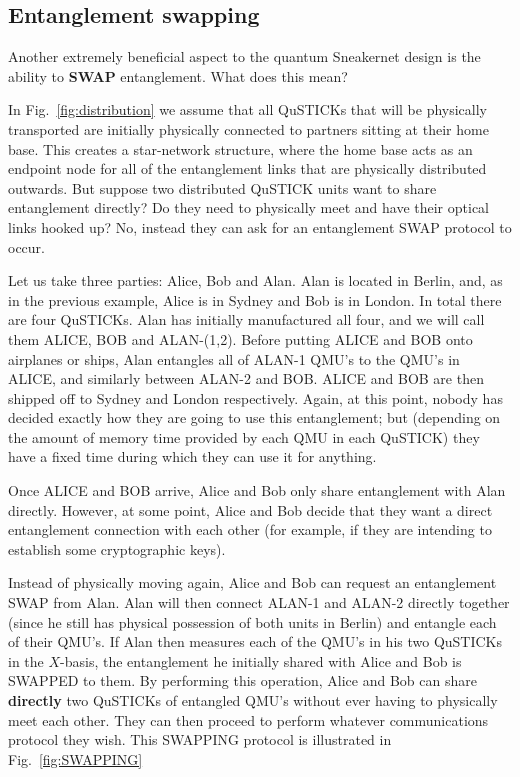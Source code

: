 \documentclass[twocolumn, aps, rmp, amsmath, amssymb, nofootinbib, superscriptaddress, longbibliography, floatfix, table-of-contents, eqsecnum]{revtex4-2}
\begin{document}
\subsection{Entanglement swapping}

Another extremely beneficial aspect to the quantum Sneakernet design is the ability to \textbf{SWAP} entanglement. What does this mean? 

In Fig.~\ref{fig:distribution} we assume that all QuSTICKs that will be physically transported are initially physically connected to partners sitting at their home base. This creates a star-network structure, where the home base acts as an endpoint node for all of the entanglement links that are physically distributed outwards. But suppose two distributed QuSTICK units want to share entanglement directly? Do they need to physically meet and have their optical links hooked up? No, instead they can ask for an entanglement SWAP protocol to occur. 

Let us take three parties: Alice, Bob and Alan. Alan is located in Berlin, and, as in the previous example, Alice is in Sydney and Bob is in London. In total there are four QuSTICKs. Alan has initially manufactured all four, and we will call them ALICE, BOB and ALAN-(1,2). Before putting ALICE and BOB onto airplanes or ships, Alan entangles all of ALAN-1 QMU's to the QMU's in ALICE, and similarly between ALAN-2 and BOB. ALICE and BOB are then shipped off to Sydney and London respectively. Again, at this point, nobody has decided exactly how they are going to use this entanglement; but (depending on the amount of memory time provided by each QMU in each QuSTICK) they have a fixed time during which they can use it for anything. 

Once ALICE and BOB arrive, Alice and Bob only share entanglement with Alan directly. However, at some point, Alice and Bob decide that they want a direct entanglement connection with each other (for example, if they are intending to establish some cryptographic keys).

Instead of physically moving again, Alice and Bob can request an entanglement SWAP from Alan. Alan will then connect ALAN-1 and ALAN-2 directly together (since he still has physical possession of both units in Berlin) and entangle each of their QMU's. If Alan then measures each of the QMU's in his two QuSTICKs in the $X$-basis, the entanglement he initially shared with Alice and Bob is SWAPPED to them. By performing this operation, Alice and Bob can share \textbf{directly} two QuSTICKs of entangled QMU's without ever having to physically meet each other. They can then proceed to perform whatever communications protocol they wish. This SWAPPING protocol is illustrated in Fig.~\ref{fig:SWAPPING} 
\end{document}
